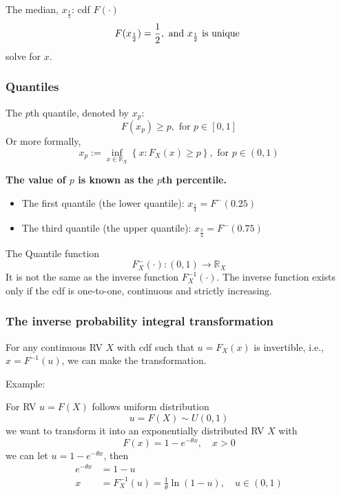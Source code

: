 \documentclass[12pt]{article}
\begin{document}
The median, $ x_{\frac{1}{2}} $:
cdf $ F(\cdot ) $
\begin{equation*}
F(x_{\frac{1}{2}}) = \frac{1}{2}, \text{ and $ x_{\frac{1}{2}} $ is unique }
\end{equation*}
solve for $ x $.


\subsubsection{Quantiles}
The $ p $th quantile, denoted by $ x_{p} $:
\begin{equation*}
		F(x_{p}) \ge p, \text{ for } p \in [0,1]
\end{equation*}
Or more formally,
\begin{equation*}
x_{p} := \inf_{x \in \mathbb{R}_{X}}\left\{ x:F_{X}(x) \ge p  \right\} , \text{ for }
p \in (0,1)
\end{equation*}

{\textbf {The value of $ p $ is known as the $ p $th percentile.}}
\begin{itemize}
\item The first quantile (the lower quantile): $ x_{\frac{1}{4}} = F^{-}(0.25) $
\item The third quantile (the upper quantile): $ x_{\frac{3}{4}} = F^{-}(0.75) $
\end{itemize}

The Quantile function
\begin{equation*}
F^{ - }_{X}(\cdot ): (0,1)\rightarrow \mathbb{R}_{X}
\end{equation*}
It is not the same as the inverse function $ F^{ - 1}_{X}(\cdot ) $.
The inverse function exists only if the cdf is one-to-one, continuous and strictly
increasing.



\subsubsection{The inverse probability integral transformation}
For any continuous RV $ X $ with cdf such that $ u = F_{X}(x) $ is invertible, 
i.e., $ x = F^{ - 1}(u) $, we can make the transformation.

Example:

For RV $ u = F(X) $ follows uniform distribution
\begin{equation*}
u = F(X) \sim U(0,1)
\end{equation*}
we want to transform it into an exponentially distributed RV $ X $ with 
\begin{equation*}
F(x) = 1 - e^{ - \theta x}, \quad x > 0
\end{equation*}
we can let $ u = 1 - e^{ - \theta x} $, then
\begin{align*}
e^{ - \theta x} &= 1 - u\\
x &= F_{X}^{ - 1}(u) =  \frac{1}{\theta}\ln (1 - u), \quad u \in (0,1)
\end{align*}
\end{document}
